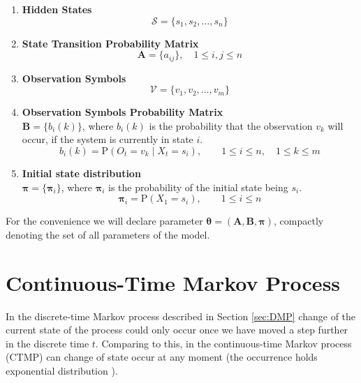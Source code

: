\documentclass[thesis=M,english]{FITthesis}[2012/10/20]
\newcommand{\matr}[1]{\mathbf{#1}}
\begin{document}
\begin{enumerate}[resume]
\setcounter{enumi}{0}
\item \textbf{Hidden States}
\begin{equation}
\mathcal{S} = \{ s_1,s_2, \dots, s_n \}
\end{equation} 
\item \textbf{State Transition Probability Matrix}
\begin{equation}\label{eq:tp}
\matr{A} = \{ a_{ij} \}, \quad 1 \leq i,j \leq n
\end{equation} 
\item \textbf{Observation Symbols}
\begin{equation}
\mathcal{V} = \{ v_1,v_2, \dots, v_m \} 
\end{equation}
\item \textbf{Observation Symbols Probability Matrix} \\
$\matr{B} = \{ b_{i}(k) \}$, where $b_{i}(k)$ is the probability that the observation $v_k$ will occur, if the system is currently in state $i$. 
\begin{equation}
b_i(k) = \mathrm{P}( O_t = v_k  \mid X_t = s_i), \qquad 1 \leq i \leq n, \quad 1 \leq k \leq m
\end{equation}
\item \textbf{Initial state distribution} \\
$\boldsymbol\pi = \{ \boldsymbol\pi_i \}$, where $\boldsymbol\pi_i$ is the probability of the initial state being $s_i$.
\begin{equation}
\boldsymbol\pi_{i} = \mathrm{P}(X_1 = s_i), \qquad 1 \leq i \leq n
\end{equation}
\end{enumerate}

For the convenience we will declare parameter $\boldsymbol{\theta} = (\matr{A},\matr{B},\boldsymbol\pi)$, compactly denoting the set of all parameters of the model. 

\section{Continuous-Time Markov Process}\label{sec:ctmp}

In the discrete-time Markov process described in Section \ref{sec:DMP} change of the current state of the process could only occur once we have moved a step further in the discrete time $t$. Comparing to this, in the continuous-time Markov process (CTMP) can change of state occur at any moment (the occurrence holds exponential distribution ).
\end{document}
